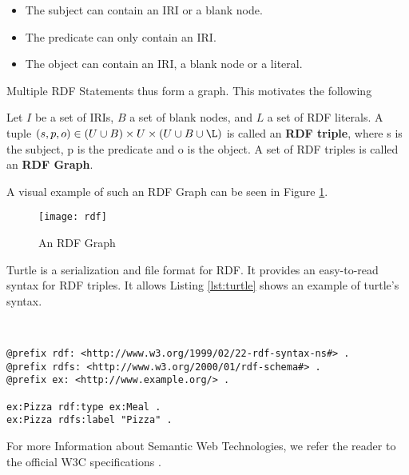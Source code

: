 \begin{itemize}
    \item The subject can contain an IRI or a blank node.
    \item The predicate can only contain an IRI.
    \item The object can contain an IRI, a blank node or a literal.
\end{itemize}

Multiple RDF Statements thus form a graph. This motivates the following

\begin{definition}
    Let $I$ be a set of IRIs, $B$ a set of blank nodes, and $L$ a set of RDF literals. A tuple $\displaystyle (s,p,o) \in (U \cup B) \times U \times (U \cup B \cup \L)$ is called an \textbf{RDF triple}, where s is the subject, p is the predicate and o is the object. A set of RDF triples is called an \textbf{RDF Graph}.
\end{definition}

A visual example of such an RDF Graph can be seen in Figure \ref{fig:rdfgraph}.

\begin{figure}[H]
    \centering
    \texttt{[image: rdf]}
    \caption[]{An RDF Graph}
    \label{fig:rdfgraph}
\end{figure}

Turtle is a serialization and file format for RDF. It provides an easy-to-read syntax for RDF triples. It allows  Listing \ref{lst:turtle} shows an example of turtle's syntax.

\

\begin{lstlisting}[caption={turtle example}, label=lst:turtle]
@prefix rdf: <http://www.w3.org/1999/02/22-rdf-syntax-ns#> .
@prefix rdfs: <http://www.w3.org/2000/01/rdf-schema#> .
@prefix ex: <http://www.example.org/> .

ex:Pizza rdf:type ex:Meal .
ex:Pizza rdfs:label "Pizza" .

\end{lstlisting}

For more Information about Semantic Web Technologies, we refer the reader to the official W3C specifications \cite{rdf, rdfs, owl, turtle, sparql, xsd}.